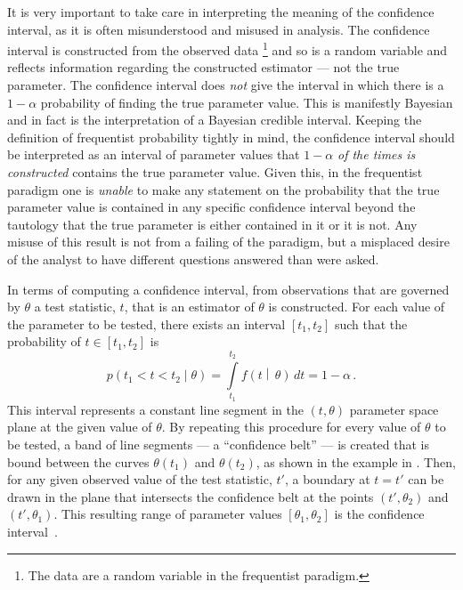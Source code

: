 It is very important to take care in interpreting the meaning of the confidence interval, as it is often misunderstood and misused in analysis.
The confidence interval is constructed from the observed data%
\footnote{The data are a random variable in the frequentist paradigm.}
and so is a random variable and reflects information regarding the constructed estimator --- not the true parameter.
The confidence interval does \emph{not} give the interval in which there is a $1-\alpha$ probability of finding the true parameter value.
This is manifestly Bayesian and in fact is the interpretation of a Bayesian credible interval.
Keeping the definition of frequentist probability tightly in mind, the confidence interval should be interpreted as an interval of parameter values that $1-\alpha$ \emph{of the times is constructed} contains the true parameter value.
Given this, in the frequentist paradigm one is \emph{unable} to make any statement on the probability that the true parameter value is contained in any specific confidence interval beyond the tautology that the true parameter is either contained in it or it is not.
Any misuse of this result is not from a failing of the paradigm, but a misplaced desire of the analyst to have different questions answered than were asked.

In terms of computing a confidence interval, from observations that are governed by $\theta$ a test statistic, $t$, that is an estimator of $\theta$ is constructed.
For each value of the parameter to be tested, there exists an interval $\left[t_{1}, t_{2}\right]$ such that the probability of $t \in \left[t_{1}, t_{2}\right]$ is
\begin{equation}
 p\left(t_{1} < t < t_{2}\middle|\theta\right) = \int\limits_{t_{1}}^{t_{2}} f\left(t\middle|\,\theta\right)\,dt = 1-\alpha\,.
 \label{eq:confidence_interval_coverage}
\end{equation}
This interval represents a constant line segment in the $\left(t, \theta\right)$ parameter space plane at the given value of $\theta$.
By repeating this procedure for every value of $\theta$ to be tested, a band of line segments --- a ``confidence belt'' --- is created that is bound between the curves $\theta\left(t_{1}\right)$ and $\theta\left(t_{2}\right)$, as shown in the example in .
Then, for any given observed value of the test statistic, $t'$, a boundary at $t = t'$ can be drawn in the plane that intersects the confidence belt at the points $\left(t', \theta_{2}\right)$ and $\left(t', \theta_{1}\right)$.
This resulting range of parameter values $\left[\theta_{1}, \theta_{2}\right]$ is the confidence interval~\cite{Cranmer:2015nia,PDG2018:Ch39}.

